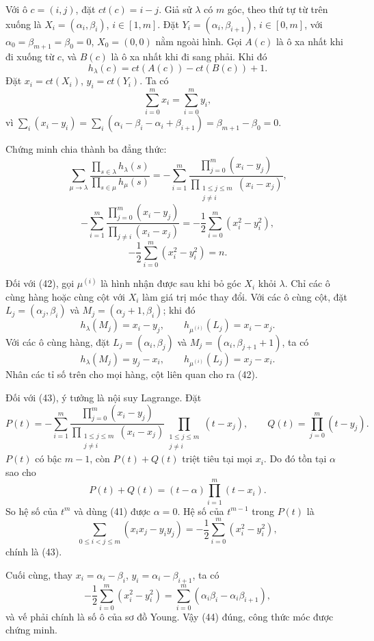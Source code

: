 \documentclass[11pt]{article}
\begin{document}
Với ô \(c=(i,j)\), đặt \(ct(c)=i-j\). Giả sử \(\lambda\) có \(m\) góc, theo
thứ tự từ trên xuống là \(X_i=(\alpha_i,\beta_i)\), \(i\in[1,m]\). Đặt
\(Y_i=(\alpha_i,\beta_{i+1})\), \(i\in[0,m]\), với
\(\alpha_0=\beta_{m+1}=\beta_0=0\), \(X_0=(0,0)\) nằm ngoài hình. Gọi \(A(c)\)
là ô xa nhất khi đi xuống từ \(c\), và \(B(c)\) là ô xa nhất khi đi sang phải.
Khi đó
\[
h_\lambda(c)=ct(A(c))-ct(B(c))+1.
\]
Đặt \(x_i=ct(X_i)\), \(y_i=ct(Y_i)\). Ta có
\[
\sum_{i=0}^m x_i=\sum_{i=0}^m y_i,
\tag{41}
\]
vì \(\sum_i(x_i-y_i)=\sum_i(\alpha_i-\beta_i-\alpha_i+\beta_{i+1})
=\beta_{m+1}-\beta_0=0\).

Chứng minh chia thành ba đẳng thức:
\[
\sum_{\mu\to\lambda}
\frac{\prod_{s\in\lambda}h_\lambda(s)}
{\prod_{s\in\mu}h_\mu(s)}
=-
\sum_{i=1}^m
\frac{\prod_{j=0}^m(x_i-y_j)}
{\prod_{\substack{1\le j\le m\\j\ne i}}(x_i-x_j)},
\tag{42}
\]
\[
-
\sum_{i=1}^m
\frac{\prod_{j=0}^m(x_i-y_j)}
{\prod_{j\ne i}(x_i-x_j)}
=-\frac12\sum_{i=0}^m(x_i^2-y_i^2),
\tag{43}
\]
\[
-\frac12\sum_{i=0}^m(x_i^2-y_i^2)=n.
\tag{44}
\]

Đối với (42), gọi \(\mu^{(i)}\) là hình nhận được sau khi bỏ góc \(X_i\) khỏi
\(\lambda\). Chỉ các ô cùng hàng hoặc cùng cột với \(X_i\) làm giá trị móc
thay đổi. Với các ô cùng cột, đặt \(L_j=(\alpha_j,\beta_i)\) và
\(M_j=(\alpha_j+1,\beta_i)\); khi đó
\[
h_\lambda(M_j)=x_i-y_j,\qquad h_{\mu^{(i)}}(L_j)=x_i-x_j.
\]
Với các ô cùng hàng, đặt \(L_j=(\alpha_i,\beta_j)\) và
\(M_j=(\alpha_i,\beta_{j+1}+1)\), ta có
\[
h_\lambda(M_j)=y_j-x_i,\qquad h_{\mu^{(i)}}(L_j)=x_j-x_i.
\]
Nhân các tỉ số trên cho mọi hàng, cột liên quan cho ra (42).

Đối với (43), ý tưởng là nội suy Lagrange. Đặt
\[
P(t)=-
\sum_{i=1}^m
\frac{\prod_{j=0}^m(x_i-y_j)}
{\prod_{\substack{1\le j\le m\\j\ne i}}(x_i-x_j)}
\prod_{\substack{1\le j\le m\\j\ne i}}(t-x_j),\qquad
Q(t)=\prod_{j=0}^m(t-y_j).
\]
\(P(t)\) có bậc \(m-1\), còn \(P(t)+Q(t)\) triệt tiêu tại mọi \(x_i\). Do đó
tồn tại \(\alpha\) sao cho
\[
P(t)+Q(t)=(t-\alpha)\prod_{i=1}^m(t-x_i).
\]
So hệ số của \(t^m\) và dùng (41) được \(\alpha=0\). Hệ số của \(t^{m-1}\)
trong \(P(t)\) là
\[
\sum_{0\le i<j\le m}(x_ix_j-y_iy_j)
=-\frac12\sum_{i=0}^m(x_i^2-y_i^2),
\]
chính là (43).

Cuối cùng, thay \(x_i=\alpha_i-\beta_i\), \(y_i=\alpha_i-\beta_{i+1}\), ta có
\[
-\frac12\sum_{i=0}^m(x_i^2-y_i^2)
=\sum_{i=0}^m(\alpha_i\beta_i-\alpha_i\beta_{i+1}),
\]
và vế phải chính là số ô của sơ đồ Young. Vậy (44) đúng, công thức móc được
chứng minh.
\end{document}
